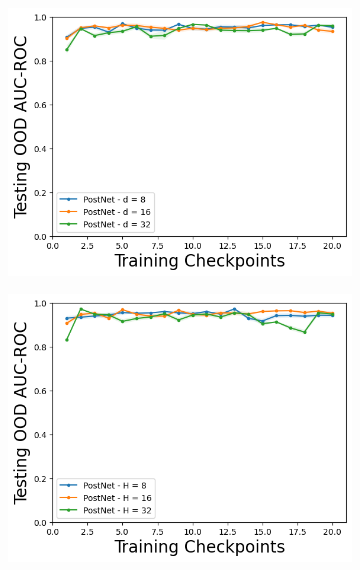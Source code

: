 \begin{figure}
    \begin{subfigure}{.3\textwidth}
        \includegraphics[width=\textwidth]{sections/011_icml2022/resources/CartPoleOOD-v0-AUC-ROC-epistemic_-testing-hyperparameter-flow_length-postnet.png}
    \end{subfigure}
    \begin{subfigure}{.3\textwidth}
        \includegraphics[width=\textwidth]{sections/011_icml2022/resources/CartPoleOOD-v0-AUC-ROC-epistemic_-testing-hyperparameter-latent_dim-postnet.png}
    \end{subfigure}
        \begin{subfigure}{.3\textwidth}

\end{subfigure}
\end{figure}
